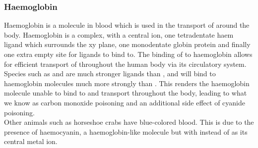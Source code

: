 \documentclass[../main]{subfiles}
\begin{document}
	\subsubsection{Haemoglobin}

	Haemoglobin is a molecule in blood which is used in the transport of  around the body. Haemoglobin is a complex, with a central  ion, one tetradentate haem ligand which surrounds the xy plane, one monodentate globin protein and finally one extra empty site for  ligands to bind to. The binding of  to haemoglobin allows for efficient transport of  throughout the human body via its circulatory system. \\

	Species such as  and  are much stronger ligands than , and will bind to haemoglobin molecules much more strongly than . This renders the haemoglobin molecule unable to bind to and transport  throughout the body, leading to what we know as carbon monoxide poisoning and an additional side effect of cyanide poisoning. \\

	Other animals such as horseshoe crabs have blue-colored blood. This is due to the presence of haemocyanin, a haemoglobin-like molecule but with  instead of  as its central metal ion. 
\end{document}
